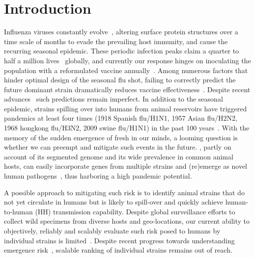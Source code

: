 \documentclass[onecolumn, compsoc,10pt]{IEEEtran}
\begin{document}
\vspace{10pt}
\section*{Introduction}
Influenza viruses constantly evolve~\cite{dos2016influenza},   altering surface protein structures over a time scale of months   to evade the prevailing host immunity, and cause the  recurring seasonal  epidemic. These periodic  infection peaks claim a quarter to half a million lives~\cite{huddleston2020integrating} globally,  and currently our response hinges on   inoculating  the  population with a  reformulated  vaccine annually~\cite{boni2008vaccination,dos2016influenza}.  Among numerous factors that hinder optimal design of the seasonal flu shot, failing to correctly predict the future dominant strain  dramatically reduces vaccine effectiveness~\cite{tricco2013comparing}. Despite  recent advances~\cite{neher2014predicting,huddleston2020integrating} such predictions remain imperfect. In addition to  the seasonal  epidemic,  \infl strains spilling over into humans from animal reservoirs have triggered  pandemics  at least four times (1918 Spanish flu/H1N1, 1957 Asian flu/H2N2, 1968 hongkong flu/H3N2, 2009 swine flu/H1N1) in the past 100 years~\cite{shao2017evolution}. With the memory of the  sudden emergence of \cov %
fresh in our minds, a looming question  is whether we can  preempt and mitigate such events in the future.  \infl,  partly on account of its segmented genome and its wide prevalence in common animal hosts, can easily incorporate genes from multiple strains and (re)emerge as novel human pathogens~\cite{reid2003origin,vergara2014ns},    thus harboring  a high pandemic potential.



A possible approach to mitigating such risk is to identify  animal strains  that do not yet circulate in humans but is likely to spill-over and quickly achieve human-to-human (HH) transmission capability. Despite global surveillance efforts to  collect wild specimens from diverse hosts and geo-locations, our  current ability to objectively, reliably and scalably  evaluate such risk posed to  humans by  individual   strains  is  limited~\cite{wille2021accurately}. Despite recent progress towards understanding emergence risk~\cite{pulliam2009ability,grewelle2020larger,grange2021ranking}, scalable ranking of individual strains remains out of reach.
\end{document}
